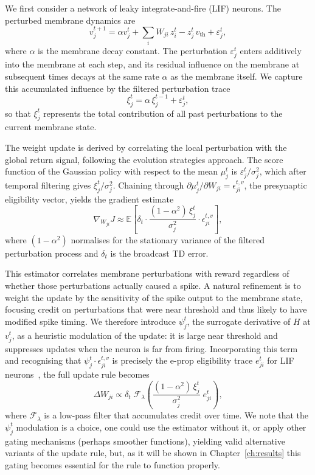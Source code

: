     We first consider a network of leaky integrate-and-fire (LIF) neurons.
    The perturbed membrane dynamics are
    \[
        v_j^{t+1} = \alpha v_j^t + \sum_i W_{ji}\, z_i^t - z_j^t\, v_{\mathrm{th}}
                    + \varepsilon_j^t,
    \]
    where $\alpha$ is the membrane decay constant.
    The perturbation $\varepsilon_j^t$ enters additively into the membrane at each
    step, and its residual influence on the membrane at subsequent times decays at
    the same rate $\alpha$ as the membrane itself.
    We capture this accumulated influence by the filtered perturbation trace
    \[
        \xi_j^t = \alpha\, \xi_j^{t-1} + \varepsilon_j^t,
    \]
    so that $\xi_j^t$ represents the total contribution of all past perturbations
    to the current membrane state.
    
    The weight update is derived by correlating the local perturbation with the
    global return signal, following the evolution strategies approach.
    The score function of the Gaussian policy with respect to the mean $\mu_j^t$
    is $\varepsilon_j^t / \sigma_j^2$, which after temporal filtering gives
    $\xi_j^t / \sigma_j^2$.
    Chaining through $\partial \mu_j^t / \partial W_{ji} = \epsilon_{ji}^{t,v}$,
    the presynaptic eligibility vector, yields the gradient estimate
    \[
        \nabla_{W_{ji}} J
        \approx
        \mathbb{E}\!\left[
            \delta_t \cdot
            \frac{(1 - \alpha^2)\,\xi_j^t}{\sigma_j^2} \cdot
            \epsilon_{ji}^{t,v}
        \right],
    \]
    where $(1-\alpha^2)$ normalises for the stationary variance of the filtered
    perturbation process and $\delta_t$ is the broadcast TD error.
    
    This estimator correlates membrane perturbations with reward regardless of
    whether those perturbations actually caused a spike.
    A natural refinement is to weight the update by the sensitivity of the spike
    output to the membrane state, focusing credit on perturbations that were near
    threshold and thus likely to have modified spike timing.
    We therefore introduce $\psi_j^t$, the surrogate derivative of $H$ at
    $v_j^t$, as a heuristic modulation of the update: it is large near threshold
    and suppresses updates when the neuron is far from firing.
    Incorporating this term and recognising that $\psi_j^t \cdot \epsilon_{ji}^{t,v}$
    is precisely the e-prop eligibility trace $e_{ji}^t$ for LIF
    neurons~\cite{eprop2020}, the full update rule becomes
    \[
        \Delta W_{ji}
        \propto
        \delta_t\;
        \mathcal{F}_{\lambda}
        \!\left(
            \frac{(1 - \alpha^2)\, \xi_j^t}{\sigma_j^2}\;
            e_{ji}^t
        \right),
    \]
    where $\mathcal{F}_{\lambda}$ is a low-pass filter that accumulates credit
    over time.
    We note that the $\psi_j^t$ modulation is a choice,
    one could use the estimator without it, or apply other gating mechanisms (perhaps smoother functions), yielding
    valid alternative variants of the update rule, but, as it will be shown in Chapter~\ref{ch:results} this gating becomes essential for the rule to function properly.
    
